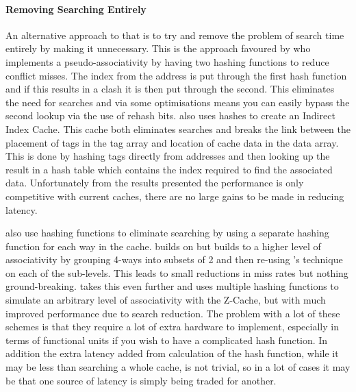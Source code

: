 \paragraph{Removing Searching Entirely}

An alternative approach to that is to try and remove the problem of search time entirely by making it unnecessary. This is the approach favoured by \citet{agarwalColumnassociativeCachesTechnique1993} who implements a pseudo-associativity by having two hashing functions to reduce conflict misses. The index from the address is put through the first hash function and if this results in a clash it is then put through the second. This eliminates the need for searches and via some optimisations means you can easily bypass the second lookup via the use of rehash bits. \citet{hallnorFullyAssociativeSoftwaremanaged2000} also uses hashes to create an Indirect Index Cache. This cache both eliminates searches and breaks the link between the placement of tags in the tag array and location of cache data in the data array. This is done by hashing tags directly from addresses and then looking up the result in a hash table which contains the index required to find the associated data. Unfortunately from the results presented the performance is only competitive with current caches, there are no large gains to be made in reducing latency. 

\citeauthor{seznecSkewedassociativeCaches1993} \cite{seznecSkewedassociativeCaches1993, seznecCaseTwowaySkewedassociative1993, bodinSkewedAssociativityImproves1997} also use hashing functions to eliminate searching by using a separate hashing function for each way in the cache. \citet{djordjalianMinimallyskewedassociativeCaches2002} builds on \citeauthor{seznecCaseTwowaySkewedassociative1993} but builds to a higher level of associativity by grouping 4-ways into subsets of 2 and then re-using \citeauthor{seznecCaseTwowaySkewedassociative1993}'s technique on each of the sub-levels. This leads to small reductions in miss rates but nothing ground-breaking. \citet{sanchezZCacheDecouplingWays2010} takes this even further and uses multiple hashing functions to simulate an arbitrary level of associativity with the Z-Cache, but with much improved performance due to search reduction. The problem with a lot of these schemes is that they require a lot of extra hardware to implement, especially in terms of functional units if you wish to have a complicated hash function. In addition the extra latency added from calculation of the hash function, while it may be less than searching a whole cache, is not trivial, so in a lot of cases it may be that one source of latency is simply being traded for another. 

